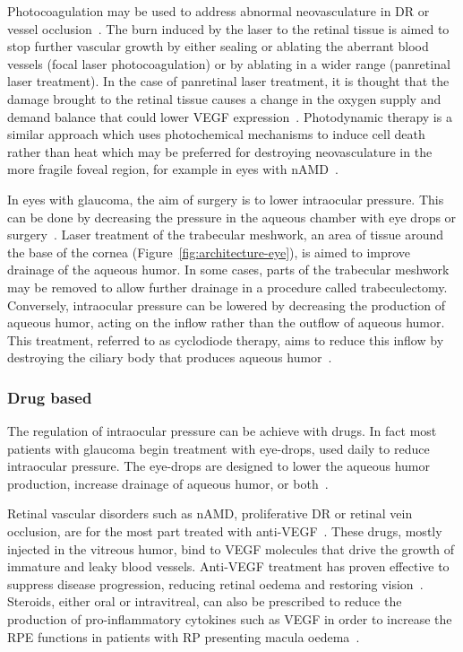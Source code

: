 \documentclass{article}
\begin{document}
Photocoagulation may be used to address abnormal neovasculature in DR or vessel occlusion~\cite{Evans_2014}.
The burn induced by the laser to the retinal tissue is aimed to stop further vascular growth by either sealing or ablating the aberrant blood vessels (focal laser photocoagulation) or by ablating in a wider range (panretinal laser treatment).
In the case of panretinal laser treatment, it is thought that the damage brought to the retinal tissue causes a change in the oxygen supply and demand balance that could lower VEGF expression~\cite{Evans_2014}.
Photodynamic therapy is a similar approach which uses photochemical mechanisms to induce cell death rather than heat which may be preferred for destroying neovasculature in the more fragile foveal region, for example in eyes with nAMD~\cite{SchmidtErfurth_2000}.

In eyes with glaucoma, the aim of surgery is to lower intraocular pressure.
This can be done by decreasing the pressure in the aqueous chamber with eye drops or surgery~\cite{Quigley_2011}.
Laser treatment of the trabecular meshwork, an area of tissue around the base of the cornea (Figure~\ref{fig:architecture-eye}), is aimed to improve drainage of the aqueous humor.
In some cases, parts of the trabecular meshwork may be removed to allow further drainage in a procedure called trabeculectomy.
Conversely, intraocular pressure can be lowered by decreasing the production of aqueous humor, acting on the inflow rather than the outflow of aqueous humor.
This treatment, referred to as cyclodiode therapy, aims to reduce this inflow by destroying the ciliary body that produces aqueous humor~\cite{Allbon_2022}.

\subsubsection{Drug based}

The regulation of intraocular pressure can be achieve with drugs.
In fact most patients with glaucoma begin treatment with eye-drops, used daily to reduce intraocular pressure.
The eye-drops are designed to lower the aqueous humor production, increase drainage of aqueous humor, or both~\cite{Chakrabarti_2022,Quigley_2011}.

Retinal vascular disorders such as nAMD, proliferative DR or retinal vein occlusion, are for the most part treated with anti-VEGF~\cite{Andreoli_2007,Kim_2021}.
These drugs, mostly injected in the vitreous humor, bind to VEGF molecules that drive the growth of immature and leaky blood vessels.
Anti-VEGF treatment has proven effective to suppress disease progression, reducing retinal oedema and restoring vision~\cite{Andreoli_2007,Heier_2006,Kim_2021}.
Steroids, either oral or intravitreal, can also be prescribed to reduce the production of pro-inflammatory cytokines such as VEGF in order to increase the RPE functions in patients with RP presenting macula oedema~\cite{Strong_2016}.
\end{document}

